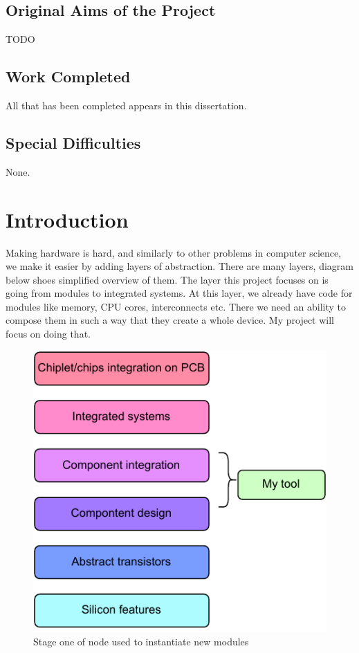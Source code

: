 \documentclass[12pt]{report}
\begin{document}
\section*{Original Aims of the Project}

TODO


\section*{Work Completed}

All that has been completed appears in this dissertation.

\section*{Special Difficulties}

None.




\tableofcontents

\chapter{Introduction}
Making hardware is hard, and similarly to other problems in computer science, we make it easier by adding layers of abstraction. There are many layers, diagram below shoes simplified overview of them. The layer this project focuses on is going from modules to integrated systems. At this layer, we already have code for modules like memory, CPU cores, interconnects etc. There we need an ability to compose them in such a way that they create a whole device. My project will focus on doing that.
\begin{figure}[h!]
    \centering
    \includegraphics[width=0.5\columnwidth]{pdfExports/LargeMapLayersOfAbstraction.pdf}
    \caption{Stage one of node used to instantiate new modules}
\end{figure}
%     
\end{document}
